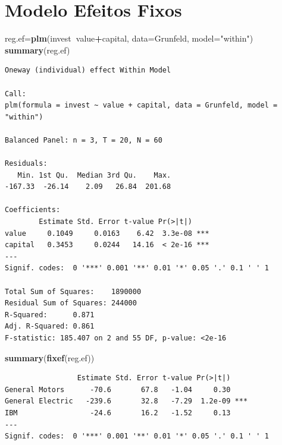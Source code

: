 \documentclass[12pt,brazil,oneside]{book}
\newenvironment{Shaded}{\begin{snugshade}}{\end{snugshade}}
\newcommand{\DataTypeTok}[1]{\textcolor[rgb]{0.13,0.29,0.53}{#1}}
\newcommand{\KeywordTok}[1]{\textcolor[rgb]{0.13,0.29,0.53}{\textbf{#1}}}
\newcommand{\NormalTok}[1]{#1}
\newcommand{\OperatorTok}[1]{\textcolor[rgb]{0.81,0.36,0.00}{\textbf{#1}}}
\newcommand{\StringTok}[1]{\textcolor[rgb]{0.31,0.60,0.02}{#1}}
\begin{document}
\hypertarget{modelo-efeitos-fixos}{%
\section{Modelo Efeitos Fixos}\label{modelo-efeitos-fixos}}

\begin{Shaded}
\begin{Highlighting}[]
\NormalTok{reg.ef=}\KeywordTok{plm}\NormalTok{(invest}\OperatorTok{~}\NormalTok{value}\OperatorTok{+}\NormalTok{capital, }
           \DataTypeTok{data=}\NormalTok{Grunfeld, }\DataTypeTok{model=}\StringTok{"within"}\NormalTok{)}
\KeywordTok{summary}\NormalTok{(reg.ef)}
\end{Highlighting}
\end{Shaded}

\begin{verbatim}
Oneway (individual) effect Within Model

Call:
plm(formula = invest ~ value + capital, data = Grunfeld, model = "within")

Balanced Panel: n = 3, T = 20, N = 60

Residuals:
   Min. 1st Qu.  Median 3rd Qu.    Max. 
-167.33  -26.14    2.09   26.84  201.68 

Coefficients:
        Estimate Std. Error t-value Pr(>|t|)    
value     0.1049     0.0163    6.42  3.3e-08 ***
capital   0.3453     0.0244   14.16  < 2e-16 ***
---
Signif. codes:  0 '***' 0.001 '**' 0.01 '*' 0.05 '.' 0.1 ' ' 1

Total Sum of Squares:    1890000
Residual Sum of Squares: 244000
R-Squared:      0.871
Adj. R-Squared: 0.861
F-statistic: 185.407 on 2 and 55 DF, p-value: <2e-16
\end{verbatim}

\begin{Shaded}
\begin{Highlighting}[]
\KeywordTok{summary}\NormalTok{(}\KeywordTok{fixef}\NormalTok{(reg.ef))}
\end{Highlighting}
\end{Shaded}

\begin{verbatim}
                 Estimate Std. Error t-value Pr(>|t|)    
General Motors      -70.6       67.8   -1.04     0.30    
General Electric   -239.6       32.8   -7.29  1.2e-09 ***
IBM                 -24.6       16.2   -1.52     0.13    
---
Signif. codes:  0 '***' 0.001 '**' 0.01 '*' 0.05 '.' 0.1 ' ' 1
\end{verbatim}
\end{document}
